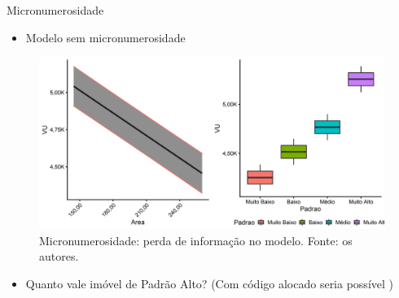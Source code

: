 \documentclass[9pt,ignorenonframetext,aspectratio=169]{beamer}
\providecommand{\tightlist}{%
  \setlength{\itemsep}{0pt}\setlength{\parskip}{0pt}}
\begin{document}
\begin{frame}{Micronumerosidade}
\protect\hypertarget{micronumerosidade}{}

\begin{itemize}[<+->]
\tightlist
\item
  \alert<1>{Modelo sem micronumerosidade}
\end{itemize}

\begin{figure}

{\centering \includegraphics[width=0.7\linewidth]{../../images/modelo-1} 

}

\caption{Micronumerosidade: perda de informação no modelo. Fonte: os autores.}\label{fig:unnamed-chunk-9}
\end{figure}

\begin{itemize}[<+->]
\tightlist
\item
  \alert<2>{Quanto vale imóvel de Padrão Alto? (Com código alocado seria possível \cite[A.6]{NBR1465302})}
\end{itemize}

\end{frame}
\end{document}
